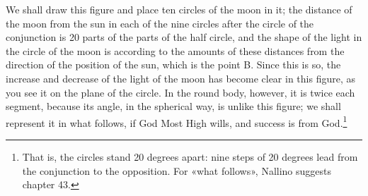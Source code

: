 \documentclass[11pt]{article}
\begin{document}
\par We shall draw this figure and place ten circles of the moon in it; the distance of the moon from the sun in each of the nine circles after the circle of the conjunction is 20 parts of the parts of the half circle, and the shape of the light in the circle of the moon is according to the amounts of these distances from the direction of the position of the sun, which is the point B. Since this is so, the increase and decrease of the light of the moon has become clear in this figure, as you see it on the plane of the circle. In the round body, however, it is twice each segment, because its angle, in the spherical way, is unlike this figure; we shall represent it in what follows, if God Most High wills, and success is from God.\footnote{That is, the circles stand 20 degrees apart: nine steps of 20 degrees lead from the conjunction to the opposition. For «what follows», Nallino suggests chapter 43.}\par
\end{document}
